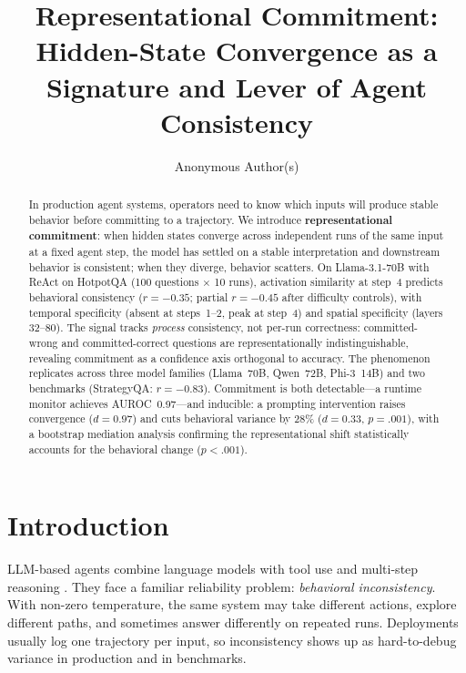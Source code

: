 \documentclass{article}
\title{Representational Commitment: \\ Hidden-State Convergence as a Signature and Lever of Agent Consistency}
\author{Anonymous Author(s)}
\begin{document}
\ifcolmsubmission
\linenumbers
\fi

\maketitle

\begin{abstract}
In production agent systems, operators need to know which inputs will produce stable behavior before committing to a trajectory. We introduce \textbf{representational commitment}: when hidden states converge across independent runs of the same input at a fixed agent step, the model has settled on a stable interpretation and downstream behavior is consistent; when they diverge, behavior scatters. On Llama-3.1-70B with ReAct on HotpotQA (100 questions $\times$ 10 runs), activation similarity at step~4 predicts behavioral consistency ($r = -0.35$; partial $r = -0.45$ after difficulty controls), with temporal specificity (absent at steps~1--2, peak at step~4) and spatial specificity (layers 32--80). The signal tracks \emph{process} consistency, not per-run correctness: committed-wrong and committed-correct questions are representationally indistinguishable, revealing commitment as a confidence axis orthogonal to accuracy. The phenomenon replicates across three model families (Llama~70B, Qwen~72B, Phi-3~14B) and two benchmarks (StrategyQA: $r = -0.83$). Commitment is both detectable---a runtime monitor achieves AUROC~0.97---and inducible: a prompting intervention raises convergence ($d = 0.97$) and cuts behavioral variance by 28\% ($d = 0.33$, $p = .001$), with a bootstrap mediation analysis confirming the representational shift statistically accounts for the behavioral change ($p < .001$).
\end{abstract}

\section{Introduction}

LLM-based agents combine language models with tool use and multi-step reasoning \citep{react, cot}. They face a familiar reliability problem: \emph{behavioral inconsistency}. With non-zero temperature, the same system may take different actions, explore different paths, and sometimes answer differently on repeated runs. Deployments usually log one trajectory per input, so inconsistency shows up as hard-to-debug variance in production and in benchmarks.
\end{document}
